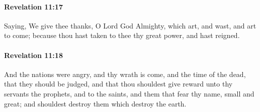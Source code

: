 		\paragraph{Revelation 11:17} %
			\label{REVELATIONNT-11-17}

			Saying, We give thee thanks, O Lord God Almighty, which art, and wast, and art to come; because thou hast taken to thee thy great power, and hast reigned.

			\begin{framed}
			\scriptsize
				\begin{compactdesc}
					\item[SBLG] 
				\end{compactdesc}
			\end{framed}

		\paragraph{Revelation 11:18} %
			\label{REVELATIONNT-11-18}

			And the nations were angry, and thy wrath is come, and the time of the dead, that they should be judged, and that thou shouldest give reward unto thy servants the prophets, and to the saints, and them that fear thy name, small and great; and shouldest destroy them which destroy the earth.

